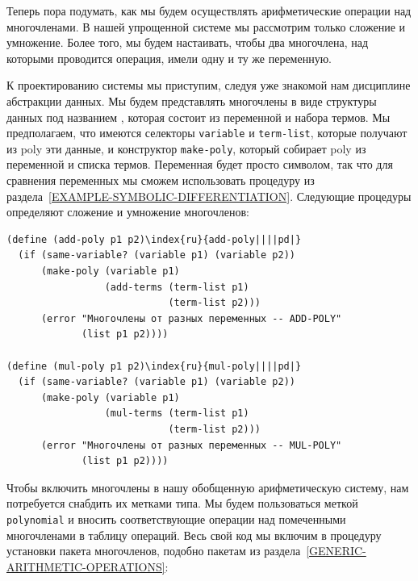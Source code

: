 Теперь пора подумать, как мы будем осуществлять
арифметические операции над многочленами. В нашей упрощенной системе мы
рассмотрим только сложение и умножение.  Более того, мы будем
настаивать, чтобы два многочлена, над которыми проводится операция,
имели одну и ту же переменную.

К проектированию системы мы приступим, следуя уже
знакомой нам дисциплине абстракции данных. Мы будем
представлять многочлены в виде структуры данных под названием  
, которая состоит из переменной
и набора
термов.  Мы предполагаем, что имеются селекторы {\tt variable}
и {\tt term-list}, которые получают из poly эти данные, и
конструктор {\tt make-poly}, который собирает poly из
переменной и списка термов.  Переменная будет просто символом, так что
для сравнения переменных
мы сможем использовать процедуру   из
раздела~\ref{EXAMPLE-SYMBOLIC-DIFFERENTIATION}.  Следующие
процедуры определяют  сложение и  умножение многочленов: 

\begin{Verbatim}[fontsize=\small]
(define (add-poly p1 p2)\index{ru}{add-poly||||pd|}
  (if (same-variable? (variable p1) (variable p2))
      (make-poly (variable p1)
                 (add-terms (term-list p1)
                            (term-list p2)))
      (error "Многочлены от разных переменных -- ADD-POLY"
             (list p1 p2))))

(define (mul-poly p1 p2)\index{ru}{mul-poly||||pd|}
  (if (same-variable? (variable p1) (variable p2))
      (make-poly (variable p1)
                 (mul-terms (term-list p1)
                            (term-list p2)))
      (error "Многочлены от разных переменных -- MUL-POLY"
             (list p1 p2))))
\end{Verbatim}

Чтобы включить многочлены в нашу обобщенную
арифметическую систему, нам потребуется снабдить их метками типа.  Мы
будем пользоваться меткой {\tt polynomial} и вносить
соответствующие операции над помеченными многочленами в таблицу
операций.  Весь свой код мы включим в процедуру установки пакета
многочленов, подобно пакетам из 
раздела~\ref{GENERIC-ARITHMETIC-OPERATIONS}:

